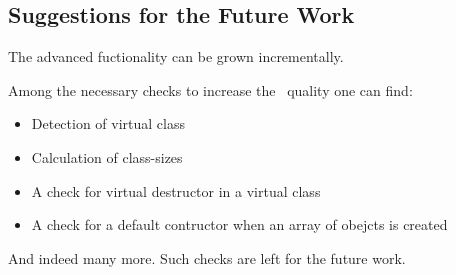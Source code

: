 \subsection{Suggestions for the Future Work}

The advanced  fuctionality can be grown incrementally. 

Among the necessary checks to increase the \pcpp\ quality one can find:
\begin{itemize}
 \item Detection of virtual class
 \item Calculation of class-sizes
 \item A check for virtual destructor in a virtual class
 \item A check for a default contructor when an array of obejcts is created
\end{itemize}

And indeed many more. Such checks are left for the future work.


